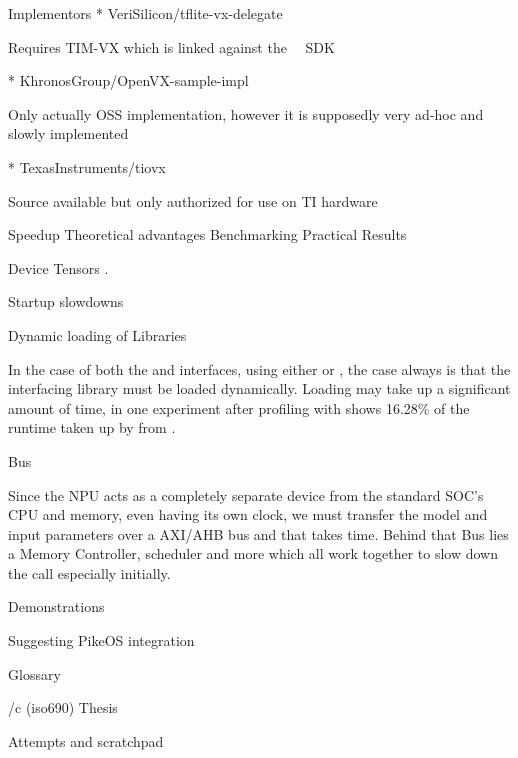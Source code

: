 \sec Implementors
\begitems
* VeriSilicon/tflite-vx-delegate

Requires TIM-VX which is linked against the \VeriSilicon~\OpenVX~SDK

* KhronosGroup/OpenVX-sample-impl

Only actually OSS implementation, however it is supposedly very ad-hoc and slowly implemented

* TexasInstruments/tiovx

Source available but only authorized for use on TI hardware
\enditems


\chap Speedup
\sec Theoretical advantages
\sec Benchmarking Practical Results

\sec Device Tensors
.

\sec Startup slowdowns

\secc Dynamic loading of Libraries

In the case of both the  and  interfaces,
using either  or ,
the case always is that the interfacing library
must be loaded dynamically.
Loading may take up a significant amount of time,
in one experiment after profiling with 
shows 16.28\% of the runtime taken up by  from .

\secc Bus

Since the NPU acts as a completely separate device from the
standard SOC's CPU and memory,
even having its own clock,
we must transfer the model and input parameters
over a AXI/AHB bus
and that takes time.
Behind that Bus lies a Memory Controller,
scheduler and more which all work together to slow down the call
especially initially.

\chap Demonstrations

\chap Suggesting PikeOS integration

\app Glossary

\makeglos

\bibchap
\usebib/c (iso690) Thesis

\app Attempts and scratchpad

